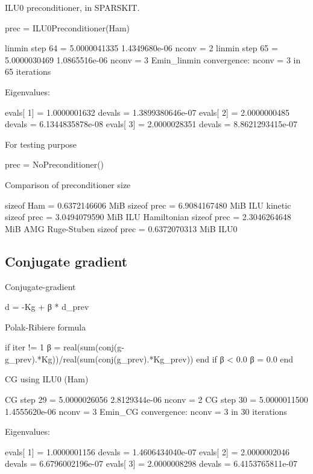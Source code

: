 ILU0 preconditioner, in SPARSKIT.
\begin{juliacode}
prec = ILU0Preconditioner(Ham)
\end{juliacode}

\begin{fullwidth}
\begin{textcode}
linmin step       64 =       5.0000041335   1.4349680e-06  nconv =     2
linmin step       65 =       5.0000030469   1.0865516e-06  nconv =     3
Emin_linmin convergence: nconv =     3 in    65 iterations

Eigenvalues:

evals[  1] =       1.0000001632 devals =   1.3899380646e-07
evals[  2] =       2.0000000485 devals =   6.1344835878e-08
evals[  3] =       2.0000028351 devals =   8.8621293415e-07
\end{textcode}
\end{fullwidth}


For testing purpose
\begin{juliacode}
prec = NoPreconditioner()
\end{juliacode}

Comparison of preconditioner size
\begin{textcode}
sizeof Ham  =       0.6372146606 MiB
sizeof prec =       6.9084167480 MiB  ILU kinetic
sizeof prec =       3.0494079590 MiB  ILU Hamiltonian
sizeof prec =       2.3046264648 MiB  AMG Ruge-Stuben
sizeof prec =       0.6372070313 MiB  ILU0
\end{textcode}


\subsection{Conjugate gradient}

Conjugate-gradient

\begin{textcode}
d = -Kg + β * d_prev
\end{textcode}

Polak-Ribiere formula
\begin{juliacode}
if iter != 1
    β = real(sum(conj(g-g_prev).*Kg))/real(sum(conj(g_prev).*Kg_prev))
end
if β < 0.0 β = 0.0 end
\end{juliacode}

CG using ILU$0$ (Ham)
\begin{fullwidth}
\begin{textcode}
CG step       29 =       5.0000026056   2.8129344e-06  nconv =     2
CG step       30 =       5.0000011500   1.4555620e-06  nconv =     3
Emin_CG convergence: nconv =     3 in    30 iterations
  
Eigenvalues:
  
evals[  1] =       1.0000001156 devals =   1.4606434040e-07
evals[  2] =       2.0000002046 devals =   6.6796002196e-07
evals[  3] =       2.0000008298 devals =   6.4153765811e-07  
\end{textcode}
\end{fullwidth}

